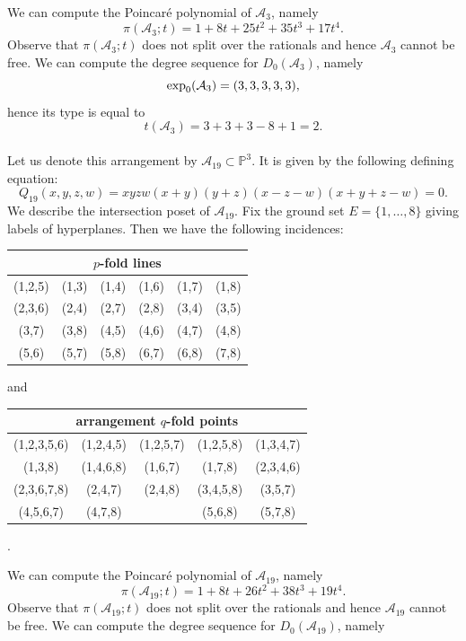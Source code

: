 \documentclass[11pt]{article}
\theoremstyle{plain}
\theoremstyle{definition}
\begin{document}
We can compute the Poincar\'e polynomial of $\mathcal{A}_{3}$, namely
$$\pi(\mathcal{A}_{3};t) = 1 + 8t + 25t^{2} + 35t^{3} + 17t^{4}.$$
Observe that $\pi(\mathcal{A}_{3};t)$ does not split over the rationals and hence $\mathcal{A}_{3}$ cannot be free. We can compute the degree sequence for $D_{0}(\mathcal{A}_{3})$, namely
$${\rm exp}_{0}(\mathcal{A}_{3}) = (3,3,3,3,3),$$
hence its type is equal to
$$t(\mathcal{A}_{3})=3+3+3-8+1 = 2.$$
\\
\noindent
{}
\vskip 5pt
\noindent
Let us denote this arrangement by $\mathcal{A}_{19} \subset \mathbb{P}^{3}$. It is given by the following defining equation:
$$Q_{19}(x,y,z,w) = xyzw(x+y)(y+z)(x-z-w)(x+y+z-w)=0.$$
We describe the intersection poset of $\mathcal{A}_{19}$. Fix the ground set $E= \{1, \ldots , 8\}$ giving labels of hyperplanes. Then we have the following incidences:
\begin{center}
\begin{tabular}{ c c c c c c }
\multicolumn{6}{c}{$p$-fold lines} \\\hline \hline
 (1,2,5) & (1,3) & (1,4) & (1,6) & (1,7) & (1,8) \\
 (2,3,6) & (2,4) & (2,7) & (2,8) & (3,4) & (3,5) \\
 (3,7) & (3,8) & (4,5) & (4,6) & (4,7) & (4,8) \\
 (5,6) & (5,7) & (5,8) & (6,7) & (6,8) & (7,8)
\end{tabular}
\end{center}
and 
\begin{center}
\begin{tabular}{ c c c c c }
\multicolumn{5}{c}{arrangement $q$-fold points} \\ \hline \hline 
(1,2,3,5,6) & (1,2,4,5) & (1,2,5,7) & (1,2,5,8) & (1,3,4,7) \\
(1,3,8) & (1,4,6,8) & (1,6,7) & (1,7,8) & (2,3,4,6) \\
(2,3,6,7,8) &  (2,4,7) & (2,4,8) & (3,4,5,8) & (3,5,7)\\
(4,5,6,7) & (4,7,8) &  & (5,6,8) &  (5,7,8)
\end{tabular}.
\end{center}
We can compute the Poincar\'e polynomial of $\mathcal{A}_{19}$, namely
$$\pi(\mathcal{A}_{19};t) = 1 + 8t + 26t^{2} + 38t^{3} + 19t^{4}.$$
Observe that $\pi(\mathcal{A}_{19};t)$ does not split over the rationals and hence $\mathcal{A}_{19}$ cannot be free. We can compute the degree sequence for $D_{0}(\mathcal{A}_{19})$, namely
\end{document}
